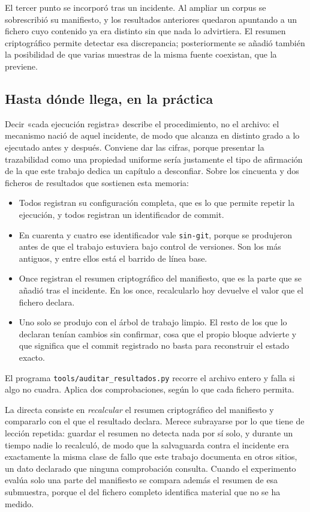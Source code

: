El tercer punto se incorporó tras un incidente. Al ampliar un corpus se sobrescribió su
manifiesto, y los resultados anteriores quedaron apuntando a un fichero cuyo contenido ya
era distinto sin que nada lo advirtiera. El resumen criptográfico permite detectar esa
discrepancia; posteriormente se añadió también la posibilidad de que varias muestras de la
misma fuente coexistan, que la previene.

\subsection*{Hasta dónde llega, en la práctica}

Decir «cada ejecución registra» describe el procedimiento, no el archivo: el mecanismo
nació de aquel incidente, de modo que alcanza en distinto grado a lo ejecutado antes y
después. Conviene dar las cifras, porque presentar la trazabilidad como una propiedad
uniforme sería justamente el tipo de afirmación de la que este trabajo dedica un capítulo a
desconfiar. Sobre los cincuenta y dos ficheros de resultados que sostienen esta memoria:

\begin{itemize}
  \item Todos registran su configuración completa, que es lo que permite repetir la
        ejecución, y todos registran un identificador de commit.
  \item En cuarenta y cuatro ese identificador vale \texttt{sin-git}, porque se produjeron
        antes de que el trabajo estuviera bajo control de versiones. Son los más antiguos,
        y entre ellos está el barrido de línea base.
  \item Once registran el resumen criptográfico del manifiesto, que es la parte que se
        añadió tras el incidente. En los once, recalcularlo hoy devuelve el valor que el
        fichero declara.
  \item Uno solo se produjo con el árbol de trabajo limpio. El resto de los que lo declaran
        tenían cambios sin confirmar, cosa que el propio bloque advierte y que significa
        que el commit registrado no basta para reconstruir el estado exacto.
\end{itemize}

El programa \texttt{tools/auditar\_resultados.py} recorre el archivo entero y falla si algo
no cuadra. Aplica dos comprobaciones, según lo que cada fichero permita.

La directa consiste en \emph{recalcular} el resumen criptográfico del manifiesto y
compararlo con el que el resultado declara. Merece subrayarse por lo que tiene de lección
repetida: guardar el resumen no detecta nada por sí solo, y durante un tiempo nadie lo
recalculó, de modo que la salvaguarda contra el incidente era exactamente la misma clase de
fallo que este trabajo documenta en otros sitios, un dato declarado que ninguna
comprobación consulta. Cuando el experimento evalúa solo una parte del manifiesto se
compara además el resumen de esa submuestra, porque el del fichero completo identifica
material que no se ha medido.


